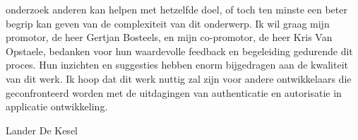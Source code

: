 onderzoek anderen kan helpen met hetzelfde doel, of toch ten minste een beter begrip kan geven van de complexiteit van dit onderwerp.
\newline
\newline
Ik wil graag mijn promotor, de heer Gertjan Bosteels, en mijn co-promotor, de heer Kris Van Opstaele, bedanken voor hun waardevolle feedback en begeleiding gedurende dit proces. Hun inzichten en suggesties hebben enorm bijgedragen aan de kwaliteit van dit werk. 
\newline
\newline
Ik hoop dat dit werk nuttig zal zijn voor andere ontwikkelaars die geconfronteerd worden met de uitdagingen van authenticatie en autorisatie in applicatie ontwikkeling.

\begin{flushright}
Lander De Kesel
\end{flushright}